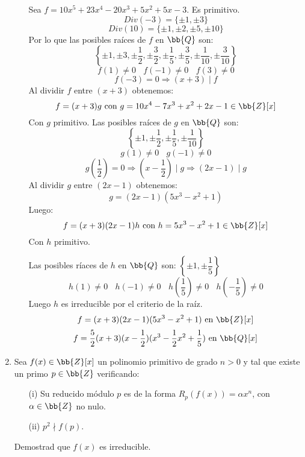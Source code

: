 \documentclass[12pt]{article}
\newcounter{ejercicio}[section] %
\newcounter{ejercicio}
\begin{document}
\begin{ejercicio}[3.5 puntos]
\begin{enumerate}
\begin{enumerate}
                    \noindent
                    Sea $f = 10x^5 + 23x^4 -20x^3 + 5x^2 + 5x-3$. Es primitivo.
                    $$Div(-3) = \{ \pm 1, \pm 3 \}$$
                    $$Div(10) = \{ \pm 1, \pm 2, \pm 5, \pm 10 \}$$
                    Por lo que las posibles raíces de $f$ en $\bb{Q}$ son:
                $$\left\{ \pm 1, \pm 3, \pm \dfrac{1}{2}, \pm \dfrac{3}{2}, \pm \dfrac{1}{5}, \pm \dfrac{3}{5}, \pm \dfrac{1}{10}, \pm \dfrac{3}{10} \right\}$$
                    $$f(1) \neq 0~~~~f(-1)\neq 0~~~~f(3) \neq 0$$
                    $$f(-3) = 0 \Rightarrow (x+3)\mid f$$
                    Al dividir $f$ entre $(x+3)$ obtenemos:
                    $$f = (x+3)g \mbox{ con } g=10x^4-7x^3+x^2+2x-1 \in \bb{Z}[x]$$
                    Con $g$ primitivo. Las posibles raíces de $g$ en $\bb{Q}$ son:
                    $$\left\{ \pm 1, \pm \dfrac{1}{2}, \pm \dfrac{1}{5}, \pm \dfrac{1}{10} \right\}$$
                    $$g(1) \neq 0~~~~g(-1)\neq 0$$
                    $$g\left(\dfrac{1}{2}\right) = 0 \Rightarrow \left(x-\dfrac{1}{2}\right) \mid g \Rightarrow (2x-1)\mid g$$
                    Al dividir $g$ entre $(2x-1)$ obtenemos:
                    $$g = (2x-1)(5x^3-x^2+1)$$
                    Luego:
                    $$f = (x+3)(2x-1)h \mbox{ con } h = 5x^3-x^2+1 \in \bb{Z}[x]$$
                    Con $h$ primitivo.

                    \noindent
                    Las posibles ríaces de $h$ en $\bb{Q}$ son: $\left\{ \pm 1, \pm \dfrac{1}{5} \right\}$
                    $$h(1) \neq 0~~~~h(-1)\neq 0~~~~h\left(\dfrac{1}{5}\right) \neq 0 ~~~~h\left(-\dfrac{1}{5}\right) \neq 0$$
                    Luego $h$ es irreducible por el criterio de la raíz.\\
                    $$f = (x+3)(2x-1)(5x^3-x^2+1) \mbox{ en } \bb{Z}[x]$$
                    $$f = \dfrac{5}{2}(x+3)(x-\dfrac{1}{2})(x^3-\dfrac{1}{2}x^2+\dfrac{1}{5}) \mbox{ en } \bb{Q}[x]$$

                    


            \end{enumerate}
            \item Sea $f(x) \in \bb{Z}[x]$ un polinomio primitivo de grado $n>0$ y tal que existe un primo $p \in \bb{Z}$ verificando:
                \begin{enumerate}
                    \item[(i)] Su reducido módulo $p$ es de la forma $R_p(f(x)) = \alpha x^n$, con $\alpha \in \bb{Z}$ no nulo.
                    \item[(ii)] $p^2 \nmid f(p)$. 
                \end{enumerate}
                Demostrad que $f(x)$ es irreducible.\\


\end{enumerate}
\end{ejercicio}
\end{document}
